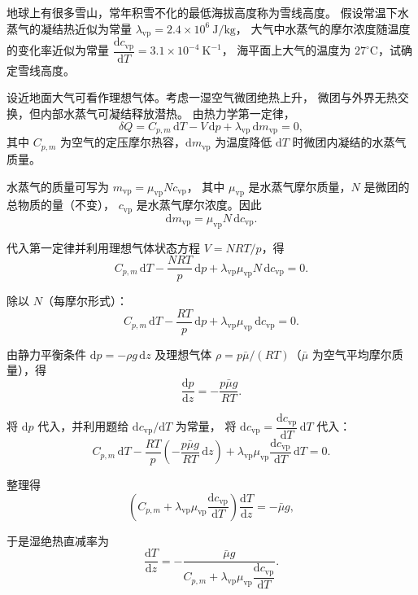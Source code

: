 \begin{question}
地球上有很多雪山，常年积雪不化的最低海拔高度称为雪线高度。
假设常温下水蒸气的凝结热近似为常量
$\lambda_{\mathrm{vp}}=2.4\times10^6\ \mathrm{J/kg}$，
大气中水蒸气的摩尔浓度随温度的变化率近似为常量
$\dfrac{\mathrm{d}c_{\mathrm{vp}}}{\mathrm{d}T}
=3.1\times10^{-4}\ \mathrm{K^{-1}}$，
海平面上大气的温度为 $27^\circ\mathrm{C}$，试确定雪线高度。
\begin{solution}
设近地面大气可看作理想气体。考虑一湿空气微团绝热上升，
微团与外界无热交换，但内部水蒸气可凝结释放潜热。
由热力学第一定律，
\[
\delta Q = C_{p,m}\,\mathrm{d}T - V\,\mathrm{d}p
+ \lambda_{\mathrm{vp}}\,\mathrm{d}m_{\mathrm{vp}} = 0,
\]
其中 $C_{p,m}$ 为空气的定压摩尔热容，$\mathrm{d}m_{\mathrm{vp}}$ 为温度降低
$\mathrm{d}T$ 时微团内凝结的水蒸气质量。

水蒸气的质量可写为 $m_{\mathrm{vp}} = \mu_{\mathrm{vp}} N c_{\mathrm{vp}}$，
其中 $\mu_{\mathrm{vp}}$ 是水蒸气摩尔质量，$N$ 是微团的总物质的量（不变），
$c_{\mathrm{vp}}$ 是水蒸气摩尔浓度。因此
\[
\mathrm{d}m_{\mathrm{vp}} = \mu_{\mathrm{vp}} N\,\mathrm{d}c_{\mathrm{vp}}.
\]

代入第一定律并利用理想气体状态方程 $V = NRT/p$，得
\[
C_{p,m}\,\mathrm{d}T - \frac{NRT}{p}\,\mathrm{d}p
+ \lambda_{\mathrm{vp}}\mu_{\mathrm{vp}} N\,\mathrm{d}c_{\mathrm{vp}} = 0.
\]

除以 $N$（每摩尔形式）：
\[
C_{p,m}\,\mathrm{d}T - \frac{RT}{p}\,\mathrm{d}p
+ \lambda_{\mathrm{vp}}\mu_{\mathrm{vp}}\,\mathrm{d}c_{\mathrm{vp}} = 0.
\]

由静力平衡条件 $\mathrm{d}p = -\rho g\,\mathrm{d}z$ 及理想气体
$\rho = p\bar\mu/(RT)$（$\bar\mu$ 为空气平均摩尔质量），得
\[
\frac{\mathrm{d}p}{\mathrm{d}z} = -\frac{p\bar\mu g}{RT}.
\]

将 $\mathrm{d}p$ 代入，并利用题给 $\mathrm{d}c_{\mathrm{vp}}/\mathrm{d}T$ 为常量，
将 $\mathrm{d}c_{\mathrm{vp}} = \dfrac{\mathrm{d}c_{\mathrm{vp}}}{\mathrm{d}T}\,\mathrm{d}T$ 代入：
\[
C_{p,m}\,\mathrm{d}T
- \frac{RT}{p}\!\left(-\frac{p\bar\mu g}{RT}\,\mathrm{d}z\right)
+ \lambda_{\mathrm{vp}}\mu_{\mathrm{vp}}\frac{\mathrm{d}c_{\mathrm{vp}}}{\mathrm{d}T}\,\mathrm{d}T = 0.
\]

整理得
\[
\left(C_{p,m} + \lambda_{\mathrm{vp}}\mu_{\mathrm{vp}}
\frac{\mathrm{d}c_{\mathrm{vp}}}{\mathrm{d}T}\right)
\frac{\mathrm{d}T}{\mathrm{d}z} = -\bar\mu g,
\]

于是湿绝热直减率为
\[
\frac{\mathrm{d}T}{\mathrm{d}z}
= -\frac{\bar\mu g}
{C_{p,m} + \lambda_{\mathrm{vp}}\mu_{\mathrm{vp}}
\dfrac{\mathrm{d}c_{\mathrm{vp}}}{\mathrm{d}T}}.
\]


\end{solution}
\end{question}
